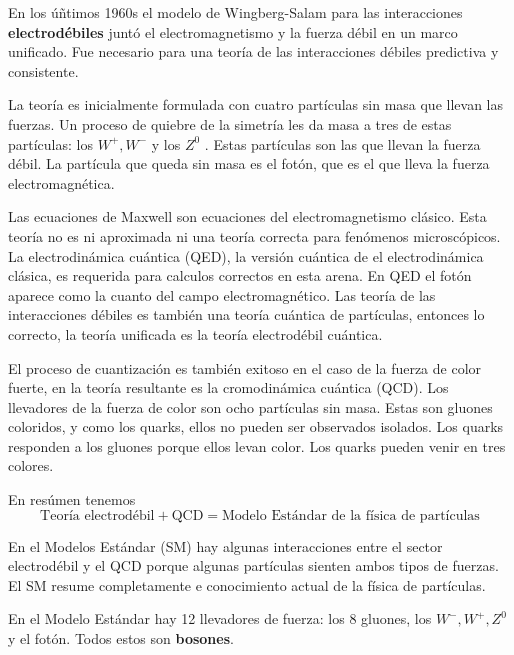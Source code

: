 En los úñtimos 1960s el modelo de Wingberg-Salam para las interacciones \textbf{electrodébiles} juntó el electromagnetismo y la fuerza débil en un marco unificado. Fue necesario para una teoría de las interacciones débiles predictiva y consistente.

La teoría es inicialmente formulada con cuatro partículas sin masa que llevan las fuerzas. Un proceso de quiebre de la simetría les da masa a tres de estas partículas: los $W^+, W^-$ y los $Z^0$ . Estas partículas son las que llevan la fuerza débil. La partícula que queda sin masa es el fotón, que es el que lleva la fuerza electromagnética.

Las ecuaciones de Maxwell son ecuaciones del electromagnetismo clásico. Esta teoría no es ni aproximada ni una teoría correcta para fenómenos microscópicos. La electrodinámica cuántica (QED), la versión cuántica de el electrodinámica clásica, es requerida para calculos correctos en esta arena. En QED el fotón aparece como la cuanto del campo electromagnético. Las teoría de las interacciones débiles es también una teoría cuántica de partículas, entonces lo correcto, la teoría unificada es la teoría electrodébil cuántica.

El proceso de cuantización es también exitoso en el caso de la fuerza de color fuerte, en la teoría resultante es la cromodinámica cuántica (QCD). Los llevadores de la fuerza de color son ocho partículas sin masa. Estas son gluones coloridos, y como los quarks, ellos no pueden ser observados isolados.  Los quarks responden a los gluones porque ellos levan color. Los quarks pueden venir en tres colores.

En resúmen tenemos
\begin{equation}
    \text{Teoría electrodébil} + \text{QCD} = \text{Modelo Estándar de la física de partículas}
\end{equation}

En el Modelos Estándar (SM) hay algunas interacciones entre el sector electrodébil y el QCD porque algunas partículas sienten ambos tipos de fuerzas. El SM resume completamente e conocimiento actual de la física de partículas.

En el Modelo Estándar hay 12 llevadores de fuerza: los 8 gluones, los $W^-,W^+,Z^0$ y el fotón. Todos estos son \textbf{bosones}.
